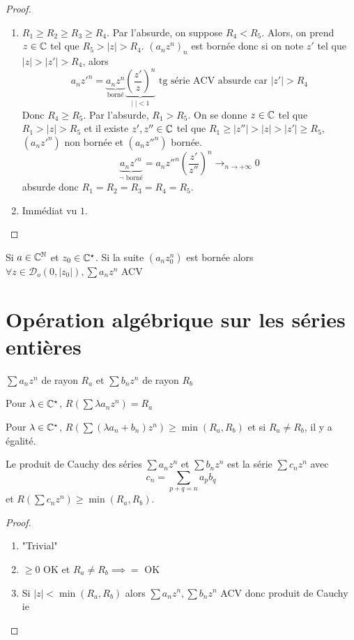 \begin{proof}
    \begin{enumerate}
        \item $R_1\geq R_2\geq R_3\geq R_4$. Par l'absurde, on suppose $R_4<R_5$. Alors, on prend $z\in\mathbb C$ tel que $R_5>|z|>R_4$. $(a_nz^n)_n$ est bornée donc si on note $z'$ tel que $|z|>|z'|>R_4$, alors \[
                a_nz'^n=\underbrace{a_nz^n}_{\text{borné}} \underbrace{\left( \frac{z'}{z}  \right)^n}_{|\;|<1} \text{ tg série ACV absurde car }|z'|>R_4
            \]
            Donc $R_4\geq R_5$. Par l'absurde, $R_1>R_5$. On se donne $z\in\mathbb C$ tel que $R_1>|z|>R_5$ et il existe $z', z''\in\mathbb C$ tel que $R_1\geq |z''|>|z|>|z'|\geq R_5$, $(a_nz'^n)$ non bornée et $(a_nz''^n)$ bornée. \[
                \underbrace{a_nz'^n}_{\lnot \text{ borné}}=a_nz''^n \left( \frac{z'}{z''} \right)^n\xrightarrow{}_{n\to+\infty}0
            \]
            absurde donc $R_1=R_2=R_3=R_4=R_5$.
        \item Immédiat vu $1$.
    \end{enumerate}
\end{proof}
% 
\begin{rem}
    Si $a\in\mathbb C^{\mathbb N}$ et $z_0\in\mathbb C^\star$. Si la suite $(a_nz_0^n)$ est bornée alors $\forall z\in\mathcal D_o(0, |z_0|), \sum a_nz^n$ ACV
\end{rem}

\section{Opération algébrique sur les séries entières}

\begin{prop}
    \Hyp $\sum a_nz^n$ de rayon $R_a$ et $\sum b_nz^n$ de rayon $R_b$
    \begin{concenum}
    \item Pour $\lambda\in\mathbb C^\star$, $R(\sum \lambda a_nz^n)=R_a$
    \item Pour $\lambda\in\mathbb C^\star$, $R(\sum(\lambda a_n+b_n)z^n)\geq \min(R_a, R_b)$ et si $R_a\neq R_b$, il y a égalité.
    \item Le produit de Cauchy des séries $\sum a_nz^n$ et $\sum b_nz^n$ est la série $\sum c_nz^n$ avec \[
            c_n=\sum_{p+q=n}a_pb_q
        \]
        et $R(\sum c_nz^n)\geq \min(R_a, R_b)$.
    \end{concenum}
\end{prop}

\begin{proof}
    \begin{enumerate}
        \item "Trivial"
        \item $\geq 0$ OK et $R_a\neq R_b\implies =$ OK
        \item Si $|z|<\min(R_a, R_b)$ alors $\sum a_nz^n, \sum b_nz^n$ ACV donc produit de Cauchy ie \conc
    \end{enumerate}
\end{proof}

